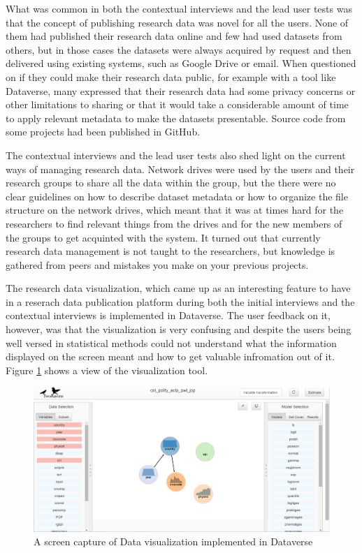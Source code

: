 What was common in both the contextual interviews and the lead user tests was
that the concept of publishing research data was novel for all the users. None
of them had published their research data online and few had used datasets from others,
but in those cases the datasets were always acquired by request and then
delivered using existing systems, such as Google Drive or email. When 
questioned on if they could make their research data public, for example with a tool
like Dataverse, many expressed that their research data had some privacy
concerns or other limitations to sharing or that it would take a considerable
amount of time to apply relevant metadata to make the datasets presentable.
Source code from some projects had been published in GitHub.

The contextual interviews and the lead user tests also shed light on the
current ways of managing research data. Network drives were used by the
users and their research groups to share all the data within the group, but
the there were no clear guidelines on how to describe dataset metadata or how
to organize the file structure on the network drives, which meant that it was
at times hard for the researchers to find relevant things from the drives and
for the new members of the groups to get acquinted with the system. It turned
out that currently research data management is not taught to the researchers,
but knowledge is gathered from peers and mistakes you make on your previous
projects.

The research data visualization, which came up as an interesting feature to
have in a reserach data publication platform during both the initial interviews
and the contextual interviews is implemented in Dataverse. The user feedback
on it, however, was that the visualization is very confusing and despite the
users being well versed in statistical methods could not understand what the
information displayed on the screen meant and how to get valuable infromation
out of it. Figure \ref{fig:tworavens} shows a view of the visualization tool.

\begin{figure}
    \begin{centering}
        \includegraphics[width=\textwidth]{images/tworavens}
    \end{centering}
    \caption{A screen capture of Data visualization implemented in Dataverse}
    \label{fig:tworavens}
\end{figure}

